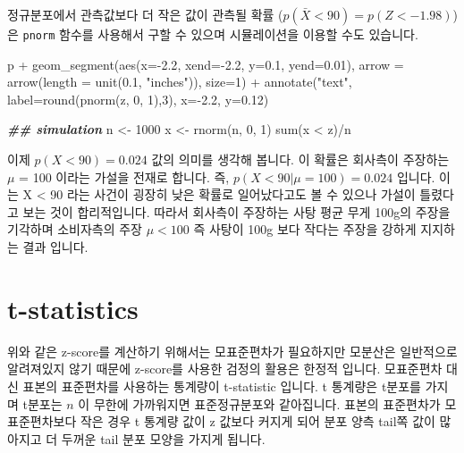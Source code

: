 \documentclass[
]{book}
\newenvironment{Shaded}{\begin{snugshade}}{\end{snugshade}}
\newcommand{\AttributeTok}[1]{\textcolor[rgb]{0.77,0.63,0.00}{#1}}
\newcommand{\DecValTok}[1]{\textcolor[rgb]{0.00,0.00,0.81}{#1}}
\newcommand{\DocumentationTok}[1]{\textcolor[rgb]{0.56,0.35,0.01}{\textbf{\textit{#1}}}}
\newcommand{\FloatTok}[1]{\textcolor[rgb]{0.00,0.00,0.81}{#1}}
\newcommand{\FunctionTok}[1]{\textcolor[rgb]{0.00,0.00,0.00}{#1}}
\newcommand{\NormalTok}[1]{#1}
\newcommand{\OtherTok}[1]{\textcolor[rgb]{0.56,0.35,0.01}{#1}}
\newcommand{\SpecialCharTok}[1]{\textcolor[rgb]{0.00,0.00,0.00}{#1}}
\newcommand{\StringTok}[1]{\textcolor[rgb]{0.31,0.60,0.02}{#1}}
\begin{document}
정규분포에서 관측값보다 더 작은 값이 관측될 확률 (\(p(\bar{X} < 90)=p(Z<-1.98)\))은 \texttt{pnorm} 함수를 사용해서 구할 수 있으며 시뮬레이션을 이용할 수도 있습니다.

\begin{Shaded}
\begin{Highlighting}[]
\NormalTok{p }\SpecialCharTok{+} \FunctionTok{geom\_segment}\NormalTok{(}\FunctionTok{aes}\NormalTok{(}\AttributeTok{x=}\SpecialCharTok{{-}}\FloatTok{2.2}\NormalTok{, }\AttributeTok{xend=}\SpecialCharTok{{-}}\FloatTok{2.2}\NormalTok{, }\AttributeTok{y=}\FloatTok{0.1}\NormalTok{, }\AttributeTok{yend=}\FloatTok{0.01}\NormalTok{), }
                 \AttributeTok{arrow =} \FunctionTok{arrow}\NormalTok{(}\AttributeTok{length =} \FunctionTok{unit}\NormalTok{(}\FloatTok{0.1}\NormalTok{, }\StringTok{"inches"}\NormalTok{)),}
                 \AttributeTok{size=}\DecValTok{1}\NormalTok{) }\SpecialCharTok{+} 
  \FunctionTok{annotate}\NormalTok{(}\StringTok{"text"}\NormalTok{, }\AttributeTok{label=}\FunctionTok{round}\NormalTok{(}\FunctionTok{pnorm}\NormalTok{(z, }\DecValTok{0}\NormalTok{, }\DecValTok{1}\NormalTok{),}\DecValTok{3}\NormalTok{), }\AttributeTok{x=}\SpecialCharTok{{-}}\FloatTok{2.2}\NormalTok{, }\AttributeTok{y=}\FloatTok{0.12}\NormalTok{)}


\DocumentationTok{\#\# simulation}
\NormalTok{n }\OtherTok{\textless{}{-}} \DecValTok{1000}
\NormalTok{x }\OtherTok{\textless{}{-}} \FunctionTok{rnorm}\NormalTok{(n, }\DecValTok{0}\NormalTok{, }\DecValTok{1}\NormalTok{)}
\FunctionTok{sum}\NormalTok{(x }\SpecialCharTok{\textless{}}\NormalTok{ z)}\SpecialCharTok{/}\NormalTok{n}
\end{Highlighting}
\end{Shaded}

이제 \(p(X<90)=0.024\) 값의 의미를 생각해 봅니다. 이 확률은 회사측이 주장하는 \(\mu\) = 100 이라는 가설을 전재로 합니다. 즉, \(p(X<90|\mu=100)=0.024\) 입니다. 이는 X \textless{} 90 라는 사건이 굉장히 낮은 확률로 일어났다고도 볼 수 있으나 가설이 틀렸다고 보는 것이 합리적입니다. 따라서 회사측이 주장하는 사탕 평균 무게 100g의 주장을 기각하며 소비자측의 주장 \(\mu < 100\) 즉 사탕이 100g 보다 작다는 주장을 강하게 지지하는 결과 입니다.

\hypertarget{t-statistics}{%
\section{t-statistics}\label{t-statistics}}

위와 같은 z-score를 계산하기 위해서는 모표준편차가 필요하지만 모분산은 일반적으로 알려져있지 않기 때문에 z-score를 사용한 검정의 활용은 한정적 입니다. 모표준편차 대신 표본의 표준편차를 사용하는 통계량이 t-statistic 입니다. t 통계량은 t분포를 가지며 t분포는 \(n\) 이 무한에 가까워지면 표준정규분포와 같아집니다. 표본의 표준편차가 모표준편차보다 작은 경우 t 통계량 값이 z 값보다 커지게 되어 분포 양측 tail쪽 값이 많아지고 더 두꺼운 tail 분포 모양을 가지게 됩니다.
\end{document}
